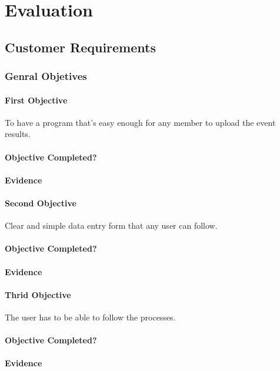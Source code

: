 \chapter{Evaluation}

\section{Customer Requirements}

\subsection{Genral Objetives}
\subsubsection{First Objective}
To have a program that's easy enough for any member to upload the event results.
\subsubsection{Objective Completed?}

\subsubsection{Evidence}

\subsubsection{Second Objective}
Clear and simple data entry form that any user can follow.
\subsubsection{Objective Completed?}

\subsubsection{Evidence}

\subsubsection{Thrid Objective}
The user has to be able to follow the processes.
\subsubsection{Objective Completed?}

\subsubsection{Evidence}

